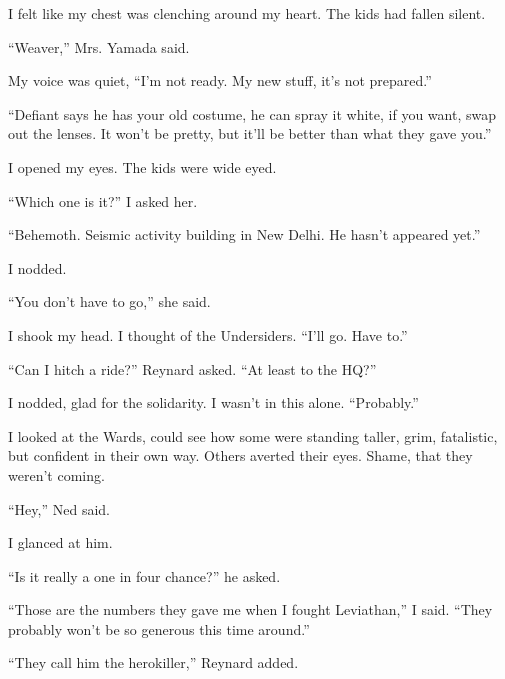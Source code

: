 I felt like my chest was clenching around my heart.  The kids had fallen silent.



``Weaver,'' Mrs. Yamada said.



My voice was quiet, ``I'm not ready.  My new stuff, it's not prepared.''



``Defiant says he has your old costume, he can spray it white, if you want, swap out the lenses.  It won't be pretty, but it'll be better than what they gave you.''



I opened my eyes.  The kids were wide eyed.



``Which one is it?''  I asked her.



``Behemoth.  Seismic activity building in New Delhi.  He hasn't appeared yet.''



I nodded.



``You don't have to go,'' she said.



I shook my head.  I thought of the Undersiders.  ``I'll go.  Have to.''



``Can I hitch a ride?'' Reynard asked.  ``At least to the HQ?''



I nodded, glad for the solidarity.  I wasn't in this alone.  ``Probably.''



I looked at the Wards, could see how some were standing taller, grim, fatalistic, but confident in their own way.  Others averted their eyes.  Shame, that they weren't coming.



``Hey,'' Ned said.



I glanced at him.



``Is it really a one in four chance?'' he asked.



``Those are the numbers they gave me when I fought Leviathan,'' I said.  ``They probably won't be so generous this time around.''



``They call him the herokiller,'' Reynard added.



